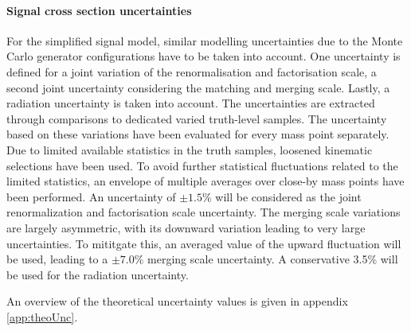 \paragraph{Signal cross section uncertainties}

For the simplified signal model,  similar modelling uncertainties due to the Monte Carlo generator configurations have to be taken into account.  One uncertainty is defined for a joint variation of the renormalisation and factorisation scale,  a second joint uncertainty considering the matching and merging scale.  Lastly,  a radiation uncertainty is taken into account. 
The uncertainties are extracted through comparisons to dedicated varied truth-level samples.  The uncertainty based on these variations have been evaluated for every mass point separately.  Due to limited available statistics in the truth samples,  loosened kinematic selections have been used.  To avoid further statistical fluctuations related to the limited statistics, an envelope of multiple averages over close-by mass points have been performed.  An uncertainty of
$ \pm 1.5\%$ will be considered as the joint renormalization and factorisation scale uncertainty. The merging scale variations are largely asymmetric, with its downward variation leading to very large uncertainties. To mititgate this, an averaged value of the upward fluctuation will be used, leading to a $\pm 7.0\%$ merging scale uncertainty.  A conservative 3.5\% will be used for the radiation uncertainty.

An overview of the theoretical uncertainty values is given in appendix \ref{app:theoUnc}.
